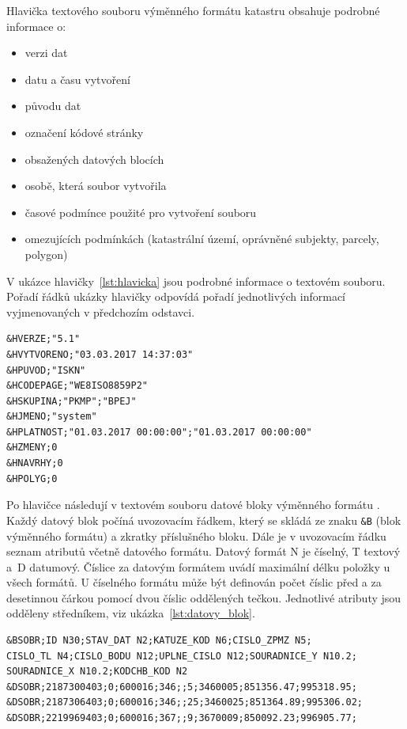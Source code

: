 Hlavička textového souboru výměnného formátu katastru obsahuje podrobné informace o:
\begin{itemize}[leftmargin=50pt]
		\item verzi dat
		\item datu a času vytvoření
		\item původu dat
		\item označení kódové stránky
		\item obsažených datových blocích
		\item osobě, která soubor vytvořila
		\item časové podmínce použité pro vytvoření souboru
		\item omezujících podmínkách (katastrální území, oprávněné subjekty, parcely, polygon)
\end{itemize}
V ukázce hlavičky~\ref{lst:hlavicka} jsou podrobné informace o
textovém souboru. Pořadí řádků ukázky hlavičky odpovídá
pořadí jednotlivých informací vyjmenovaných v předchozím odstavci.
\begin{lstlisting}[caption=Ukázka hlavičky veřejně poskytovaných dat, label=lst:hlavicka]
&HVERZE;"5.1"
&HVYTVORENO;"03.03.2017 14:37:03"
&HPUVOD;"ISKN"
&HCODEPAGE;"WE8ISO8859P2"
&HSKUPINA;"PKMP";"BPEJ"
&HJMENO;"system"
&HPLATNOST;"01.03.2017 00:00:00";"01.03.2017 00:00:00"
&HZMENY;0
&HNAVRHY;0
&HPOLYG;0
\end{lstlisting}

Po hlavičce následují v textovém souboru  datové bloky
výměnného formátu . Každý datový blok počíná uvozovacím řádkem,
který se skládá ze znaku \verb|&B| (blok výměnného formátu) a zkratky
příslušného bloku. Dále je v uvozovacím řádku seznam atributů včetně
datového formátu. Datový formát N je číselný, T textový a~D
datumový. Číslice za datovým formátem uvádí maximální délku položky u
všech formátů. U číselného formátu může být definován počet číslic
před a za desetinnou čárkou pomocí dvou číslic oddělených
tečkou. Jednotlivé atributy jsou odděleny středníkem, viz
ukázka~\ref{lst:datovy_blok}.

{\small
\begin{lstlisting}[caption=Ukázka datového bloku SOBR (souřadnice obrazu bodů polohopisu v mapě) veřejně poskytovaných dat, label=lst:datovy_blok]
&BSOBR;ID N30;STAV_DAT N2;KATUZE_KOD N6;CISLO_ZPMZ N5;
CISLO_TL N4;CISLO_BODU N12;UPLNE_CISLO N12;SOURADNICE_Y N10.2;
SOURADNICE_X N10.2;KODCHB_KOD N2
&DSOBR;2187300403;0;600016;346;;5;3460005;851356.47;995318.95;
&DSOBR;2187306403;0;600016;346;;25;3460025;851364.89;995306.02;
&DSOBR;2219969403;0;600016;367;;9;3670009;850092.23;996905.77;
\end{lstlisting}}

